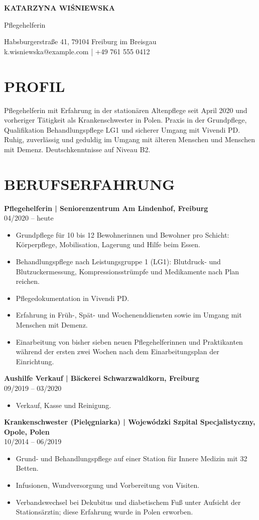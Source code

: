 \documentclass[11pt,a4paper]{article}
\newcommand{\cvsection}[1]{\section*{#1}}
\newcommand{\cvrole}[2]{\noindent\textbf{#1}\\#2\par}
\begin{document}
{\LARGE\bfseries\color{primarycolor} KATARZYNA WIŚNIEWSKA}\par
{\large\color{accentcolor} Pflegehelferin}\par
Habsburgerstraße 41, 79104 Freiburg im Breisgau\\
k.wisniewska@example.com | +49 761 555 0412

\cvsection{PROFIL}
Pflegehelferin mit Erfahrung in der stationären Altenpflege seit April 2020 und vorheriger Tätigkeit als Krankenschwester in Polen. Praxis in der Grundpflege, Qualifikation Behandlungspflege LG1 und sicherer Umgang mit Vivendi PD. Ruhig, zuverlässig und geduldig im Umgang mit älteren Menschen und Menschen mit Demenz. Deutschkenntnisse auf Niveau B2.

\cvsection{BERUFSERFAHRUNG}
\cvrole{Pflegehelferin | Seniorenzentrum Am Lindenhof, Freiburg}{04/2020 – heute}
\begin{itemize}
\item Grundpflege für 10 bis 12 Bewohnerinnen und Bewohner pro Schicht: Körperpflege, Mobilisation, Lagerung und Hilfe beim Essen.
\item Behandlungspflege nach Leistungsgruppe 1 (LG1): Blutdruck- und Blutzuckermessung, Kompressionsstrümpfe und Medikamente nach Plan reichen.
\item Pflegedokumentation in Vivendi PD.
\item Erfahrung in Früh-, Spät- und Wochenenddiensten sowie im Umgang mit Menschen mit Demenz.
\item Einarbeitung von bisher sieben neuen Pflegehelferinnen und Praktikanten während der ersten zwei Wochen nach dem Einarbeitungsplan der Einrichtung.
\end{itemize}

\cvrole{Aushilfe Verkauf | Bäckerei Schwarzwaldkorn, Freiburg}{09/2019 – 03/2020}
\begin{itemize}
\item Verkauf, Kasse und Reinigung.
\end{itemize}

\cvrole{Krankenschwester (Pielęgniarka) | Wojewódzki Szpital Specjalistyczny, Opole, Polen}{10/2014 – 06/2019}
\begin{itemize}
\item Grund- und Behandlungspflege auf einer Station für Innere Medizin mit 32 Betten.
\item Infusionen, Wundversorgung und Vorbereitung von Visiten.
\item Verbandswechsel bei Dekubitus und diabetischem Fuß unter Aufsicht der Stationsärztin; diese Erfahrung wurde in Polen erworben.
\end{itemize}
\end{document}
